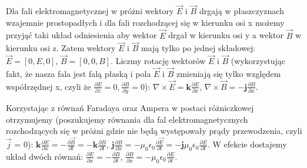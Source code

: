 Dla fali elektromagnetycznej w próżni wektory $ \vec{E} $ i $ \vec{B} $ drgają w płaszczyznach wzajemnie prostopadłych i dla fali rozchodzącej się w kierunku osi x możemy przyjąć taki układ odniesienia aby wektor $ \vec{E} $ drgał w kierunku osi y a wektor $ \vec{B} $ w kierunku osi z. Zatem wektory $ \vec{E} $ i $ \vec{B} $ mają tylko po jednej składowej:\newline
$ \vec{E} = [0, E, 0] $,\newline
$ \vec{B} = [0, 0, B] $.\newline
Liczmy rotację wektorów $ \vec{E} $ i $ \vec{B} $ (wykorzystując fakt, że nasza fala jest falą płaską i pola $ \vec{E} $ i $ \vec{B} $ zmieniają się tylko względem współrzędnej x, czyli że $ \frac{\partial E}{\partial z} = 0, \frac{\partial B}{\partial y} = 0$):\newline
$ \nabla \times \vec{E} = \textbf{k}\frac{\partial E}{\partial x} $,\newline
$ \nabla \times \vec{B} = -\textbf{j}\frac{\partial B}{\partial x} $.\newline

Korzystając z równań Faradaya oraz Ampera w postaci różniczkowej otrzymujemy (poszukujemy równania dla fal elektromagnetycznych rozchodzących się w próżni gdzie nie będą występowały prądy przewodzenia, czyli $ \vec{j} $ = 0):\newline
$ \textbf{k}\frac{\partial E}{\partial x} = -\frac{\partial \vec{B}}{\partial t} = -\textbf{k}\frac{\partial B}{\partial t} $,\newline
$ \textbf{j}\frac{\partial B}{\partial x} = -\mu_0 \epsilon_0 \frac{\partial \vec{E}}{\partial t} = -\textbf{j} \mu_0 \epsilon_0 \frac{\partial E}{\partial t} $.\newline
W efekcie dostajemy układ dwóch równań:\newline
$ \frac{\partial E}{\partial x} = -\frac{\partial B}{\partial t} $,\newline
$ \frac{\partial B}{\partial x} = - \mu_0 \epsilon_0 \frac{\partial E}{\partial t} $.\newline

